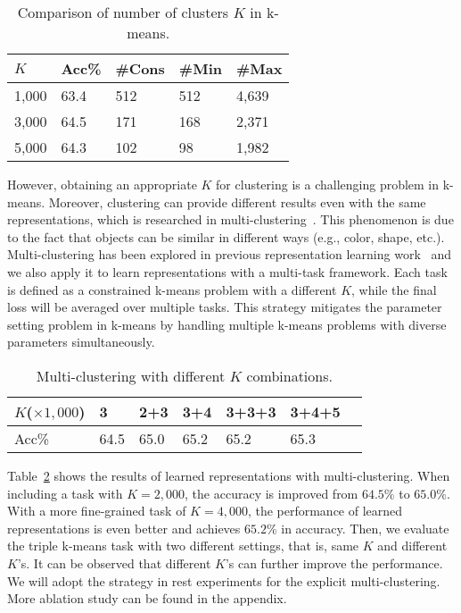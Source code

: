 \documentclass[10pt,twocolumn,letterpaper]{article}
\begin{document}
\begin{table}[!ht]
\centering
\begin{tabular}{|l|l|l|l|l|}\hline
$K$&Acc\%&\#Cons&\#Min&\#Max\\\hline
1,000&63.4&512&512&4,639\\\hline
3,000&64.5&171&168&2,371\\\hline
5,000&64.3&102&98&1,982\\\hline
\end{tabular}
\caption{Comparison of number of clusters $K$ in k-means.}\label{ta:k}
\end{table}


However, obtaining an appropriate $K$ for clustering is a challenging problem in k-means. Moreover, clustering can provide different results even with the same representations, which is researched in multi-clustering~\cite{HuQPJZ17,hu2018subspace}. This phenomenon is due to the fact that objects can be similar in different ways (e.g., color, shape, etc.). Multi-clustering has been explored in previous representation learning work~\cite{AsanoRV20a,abs-2005-04966} and we also apply it to learn representations with a multi-task framework. Each task is defined as a constrained k-means problem with a different $K$, while the final loss will be averaged over multiple tasks. This strategy mitigates the parameter setting problem in k-means by handling multiple k-means problems with diverse parameters simultaneously.

\begin{table}[!ht]
\centering
\begin{tabular}{|l|l|l|l|l|l|l|}\hline
$K$($\times 1,000$)&3&2+3&3+4&3+3+3&3+4+5\\\hline
Acc\% &64.5&65.0&65.2&65.2&65.3\\\hline
\end{tabular}
\caption{Multi-clustering with different $K$ combinations.}\label{ta:multik}
\end{table}

Table~\ref{ta:multik} shows the results of learned representations with multi-clustering. When including a task with $K=2,000$, the accuracy is improved from $64.5\%$ to $65.0\%$. With a more fine-grained task of $K=4,000$, the performance of learned representations is even better and achieves $65.2\%$ in accuracy. Then, we evaluate the triple k-means task with two different settings, that is, same $K$ and different $K$'s. It can be observed that different $K$'s can further improve the performance. We will adopt the strategy in rest experiments for the explicit multi-clustering. More ablation study can be found in the appendix.
\end{document}

